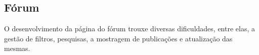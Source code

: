 \subsection{Fórum}
O desenvolvimento da página do fórum trouxe diversas dificuldades, entre elas, a gestão de filtros, pesquisas, a mostragem de publicações e atualização das mesmas.

\vspace{10mm}
\begin{figure}[htb]%
  \centering
  \qquad
  \label{fig:72}%
\end{figure}
\vspace{10mm}

\newpage

